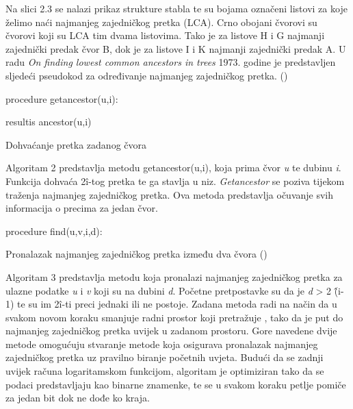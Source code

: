 \documentclass[times, utf8, zavrsni]{fer}
\begin{document}
Na slici 2.3 se nalazi prikaz strukture stabla te su bojama označeni listovi za koje želimo naći najmanjeg zajedničkog pretka (LCA). Crno obojani čvorovi su čvorovi koji su LCA tim dvama listovima. Tako je za listove H i G najmanji zajednički predak čvor B, dok je za listove I i K najmanji zajednički predak A. U radu \textit{On finding lowest common ancestors in trees} 1973. godine je predstavljen sljedeći pseudokod za određivanje najmanjeg zajedničkog pretka. (\cite{lca1,lca2,lca3})
\newline
\newline
\begin{algorithm}[H]
	
	
	procedure getancestor(u,i):

	
		resultis ancestor(u,i)\;
	\caption{Dohvaćanje pretka zadanog čvora \cite{lca1}}
	\label{LCA algoritam 1}
\end{algorithm}

Algoritam 2 predstavlja metodu getancestor(u,i), koja prima čvor \textit{u} te dubinu \textit{i}. Funkcija dohvaća 2\^ i-tog pretka te ga stavlja u niz. \textit{Getancestor} se poziva tijekom traženja najmanjeg zajedničkog pretka. Ova metoda predstavlja očuvanje svih informacija o precima za jedan čvor. 
\newline
\begin{algorithm}[H]

		procedure find(u,v,i,d):\\
	\caption{Pronalazak najmanjeg zajedničkog pretka između dva čvora (\cite{lca1})}
	\label{LCA algorithm 2}
	
\end{algorithm}

Algoritam 3 predstavlja metodu koja pronalazi najmanjeg zajedničkog pretka za ulazne podatke \textit{u} i \textit{v} koji su na dubini \textit{d}. Početne pretpostavke su da je \textit{d} > 2 \^(i-1) te su im 2\^i-ti preci jednaki ili ne postoje. Zadana metoda radi na način da u svakom novom koraku smanjuje radni prostor koji pretražuje , tako da je put do najmanjeg zajedničkog pretka uvijek u zadanom prostoru. Gore navedene dvije metode omogućuju stvaranje metode koja osigurava pronalazak najmanjeg zajedničkog pretka uz pravilno biranje početnih uvjeta. Budući da se zadnji uvijek računa logaritamskom funkcijom, algoritam je optimiziran tako da se podaci predstavljaju kao binarne znamenke, te se u svakom koraku petlje pomiče za jedan bit dok ne dođe ko kraja.
\end{document}
